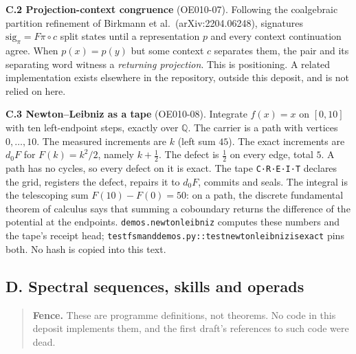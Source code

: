 \documentclass[
  11pt,
]{article}
\renewcommand{\_}{\ddcunderscore\allowbreak}
\begin{document}
\textbf{C.2 Projection-context congruence} (OE010-07). Following the
coalgebraic partition refinement of Birkmann et al.~(arXiv:2204.06248),
signatures \(\mathrm{sig}_\pi = F\pi \circ c\) split states until a
representation \(p\) and every context continuation agree. When
\(p(x) = p(y)\) but some context \(c\) separates them, the pair and its
separating word witness a \emph{returning projection}. This is
positioning. A related implementation exists elsewhere in the
repository, outside this deposit, and is not relied on here.

\textbf{C.3 Newton--Leibniz as a tape} (OE010-08). Integrate
\(f(x) = x\) on \([0, 10]\) with ten left-endpoint steps, exactly over
\(\mathbb{Q}\). The carrier is a path with vertices \(0, \dots, 10\).
The measured increments are \(k\) (left sum \(45\)). The exact
increments are \(d_0 F\) for \(F(k) = k^2/2\), namely
\(k + \tfrac{1}{2}\). The defect is \(\tfrac{1}{2}\) on every edge,
total \(5\). A path has no cycles, so every defect on it is exact. The
tape \texttt{C·R·E·I·T} declares the grid, registers the defect, repairs
it to \(d_0 F\), commits and seals. The integral is the telescoping sum
\(F(10) - F(0) = 50\): on a path, the discrete fundamental theorem of
calculus says that summing a coboundary returns the difference of the
potential at the endpoints. \texttt{demos.\allowbreak newton\_leibniz} computes
these numbers and the tape's receipt head;
\texttt{test\_fsm\_and\_demos.\allowbreak py::test\_newton\_leibniz\_is\_exact} pins
both. No hash is copied into this text.

\subsection{D. Spectral sequences, skills and
operads}\label{d.-spectral-sequences-skills-and-operads}

\begin{quote}
\textbf{Fence.} These are programme definitions, not theorems. No code
in this deposit implements them, and the first draft's references to
such code were dead.
\end{quote}
\end{document}
